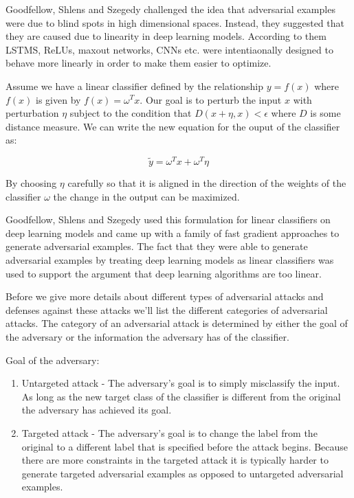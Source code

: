 \documentclass[journal,onecolumn]{IEEEtran}
\begin{document}
Goodfellow, Shlens and Szegedy \cite{goodfellow_explaining_2014} challenged the idea that adversarial examples were due to blind spots in high dimensional spaces. Instead, they suggested that they are caused due to linearity in deep learning models. According to them LSTMS, ReLUs, maxout networks, CNNs etc. were intentiaonally designed to behave more linearly in order to make them easier to optimize. %

Assume we have a linear classifier defined by the relationship $y = f(x)$ where $f(x)$ is given by $f(x) = \omega^{T}x$. Our goal is to perturb the input $x$ with perturbation $\eta$ subject to the condition that $D(x+\eta,x)<\epsilon$ where $D$ is some distance measure. We can write the new equation for the ouput of the classifier as:

\begin{equation}
\tilde{y} = \omega^{T}x + \omega^{T}\eta
\end{equation}

By choosing $\eta$ carefully so that it is aligned in the direction of the weights of the classifier $\omega$ the change in the output can be maximized. 

Goodfellow, Shlens and Szegedy \cite{goodfellow_explaining_2014} used this formulation for linear classifiers on deep learning models and came up with a family of fast gradient approaches to generate adversarial examples. The fact that they were able to generate adversarial examples by treating deep learning models as linear classifiers was used to support the argument that deep learning algorithms are too linear.

Before we give more details about different types of adversarial attacks and defenses against these attacks we'll list the different categories of adversarial attacks. The category of an adversarial attack is determined by either the goal of the adversary or the information the adversary has of the classifier.

Goal of the adversary:
\begin{enumerate}
\item Untargeted attack - The adversary's goal is to simply misclassify the input. As long as the new target class of the classifier is different from the original the adversary has achieved its goal.
\item Targeted attack - The adversary's goal is to change the label from the original to a different label that is specified before the attack begins. Because there are more constraints in the targeted attack it is typically harder to generate targeted adversarial examples as opposed to untargeted adversarial examples.
\end{enumerate}
\end{document}
